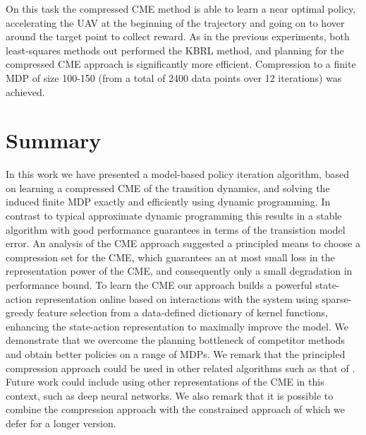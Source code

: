 \documentclass[letterpaper]{article}
\newcommand{\CsabaFLAM}{DBLP:conf/adprl/YaoSPZ14}
\newcommand{\OrmoneitKBRL}{DBLP:journals/ml/OrmoneitS02}
\begin{document}
On this task the compressed CME method is able to learn a near optimal policy, accelerating the UAV at the beginning of the trajectory and going on to hover around the target point to collect reward. As in the previous experiments, both least-squares methods out performed the KBRL method, and planning for the compressed CME approach is significantly more efficient. Compression to a finite MDP of size 100-150 (from a total of 2400 data points over 12 iterations) was achieved.




\section{Summary}

In this work we have presented a model-based policy iteration algorithm, based on learning a compressed CME of the transition dynamics, and solving the induced finite MDP exactly and efficiently using dynamic programming. In contrast to typical approximate dynamic programming this results in a stable algorithm with good performance guarantees in terms of the transistion model error. An analysis of the CME approach suggested a principled means to choose a compression set for the CME, which guarantees an at most small loss in the representation power of the CME, and consequently only a small degradation in performance bound. To learn the CME our approach builds a powerful state-action representation online based on interactions with the system using sparse-greedy feature selection from a data-defined dictionary of kernel functions, enhancing the state-action representation to maximally improve the model. We demonstrate that we overcome the planning bottleneck of competitor methods and obtain better policies on a range of MDPs. We remark that the principled compression approach could be used in other related algorithms such as that of \cite{\OrmoneitKBRL}. Future work could include using other representations of the CME in this context, such as deep neural networks. We also remark that it is possible to combine the compression approach with the constrained approach of \citet{\CsabaFLAM} which we defer for a longer version.

\clearpage
\begin{small}


%
\end{small}

\clearpage

\appendix
\end{document}
